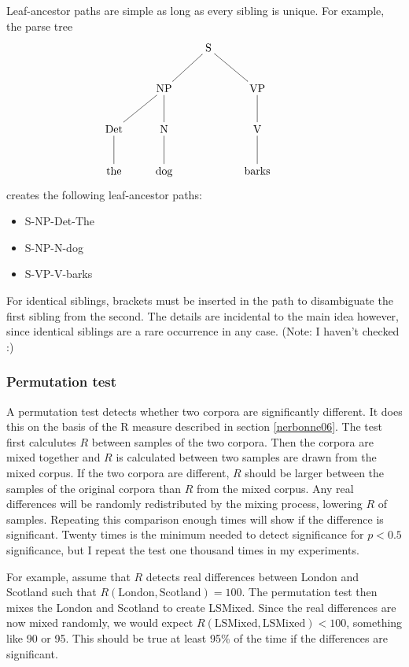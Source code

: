 \documentclass[11pt]{article}
\begin{document}
Leaf-ancestor paths are simple as long as every sibling is unique. For
example, the parse tree
\[\xymatrix{
  &&\textrm{S} \ar@{-}[dl] \ar@{-}[dr] &&\\
  &\textrm{NP} \ar@{-}[d] \ar@{-}[dl] &&\textrm{VP} \ar@{-}[d]\\
  \textrm{Det} \ar@{-}[d] & \textrm{N} \ar@{-}[d] && \textrm{V} \ar@{-}[d] \\
\textrm{the}& \textrm{dog} && \textrm{barks}\\}
\]
creates the following leaf-ancestor paths:

\begin{itemize}
\item S-NP-Det-The
\item S-NP-N-dog
\item S-VP-V-barks
\end{itemize}

For identical siblings, brackets must be inserted in the path to
disambiguate the first sibling from the second. The details are
incidental to the main idea however, since identical siblings are a
rare occurrence in any case. (Note: I haven't checked :)

\subsubsection{Permutation test}
\label{permutationtest}

A permutation test detects whether two corpora are significantly
different. It does this on the basis of the R measure described in
section \ref{nerbonne06}. The test first calculutes $R$ between
samples of the two corpora. Then the corpora are mixed together and
$R$ is calculated between two samples are drawn from the mixed
corpus. If the two corpora are different, $R$ should be larger between
the samples of the original corpora than $R$ from the mixed
corpus. Any real differences will be randomly redistributed by the
mixing process, lowering $R$ of samples. Repeating this comparison
enough times will show if the difference is significant. Twenty times
is the minimum needed to detect significance for $p < 0.5$
significance, but I repeat the test one thousand times in my
experiments.

For example, assume that $R$ detects real differences between London
and Scotland such that $R(\textrm{London},\textrm{Scotland}) =
100$. The permutation test then mixes the London and Scotland to
create LSMixed. Since the real differences are now mixed randomly, we
would expect $R(\textrm{LSMixed}, \textrm{LSMixed}) < 100$, something
like 90 or 95. This should be true at least 95\% of the time if the
differences are significant.
\end{document}
